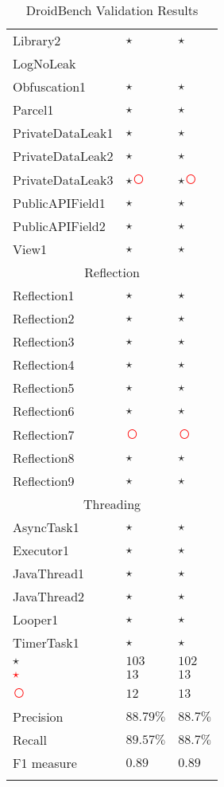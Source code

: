 \documentclass[../draft.tex]{subfiles}
\newcommand{\fp}{\textcolor{white}{\textcircled{\textcolor{red}{$\star$}}}}
\newcommand{\fn}{\textcolor{red}{\textcircled{ }}}
\newcommand{\tp}[0]{\textcircled{$\star$}}
\newcommand{\tsub}[1]{\multicolumn{3}{c}{#1}\\\hline}
\begin{document}
\begin{longtable}{l | l | l}
        Library2 & \tp & \tp\\
        LogNoLeak & & \\
        Obfuscation1 & \tp & \tp\\
        Parcel1 & \tp & \tp\\
        PrivateDataLeak1 & \tp & \tp\\
        PrivateDataLeak2 & \tp & \tp\\
        PrivateDataLeak3 & \tp \fn & \tp \fn\\
        PublicAPIField1 & \tp & \tp\\
        PublicAPIField2 & \tp & \tp\\
        View1 & \tp & \tp\\
        \hline
        \tsub{Reflection}
        Reflection1 & \tp & \tp\\
        Reflection2 & \tp & \tp\\
        Reflection3 & \tp & \tp\\
        Reflection4 & \tp & \tp\\
        Reflection5 & \tp & \tp\\
        Reflection6 & \tp & \tp\\
        Reflection7 & \fn & \fn\\
        Reflection8 & \tp & \tp\\
        Reflection9 & \tp & \tp\\
        \hline
        \tsub{Threading}
        AsyncTask1 & \tp & \tp\\
        Executor1 & \tp & \tp\\
        JavaThread1 & \tp & \tp\\
        JavaThread2 & \tp & \tp\\
        Looper1 & \tp & \tp\\
        TimerTask1 & \tp & \tp\\
        \hline\hline  %
        \tp &$ 103 $&$ 102 $\\
        \fp &$ 13 $&$ 13 $\\
        \fn &$ 12 $&$ 13 $\\
        Precision & $ 88.79 \%$ & $ 88.7 \%$\\
        Recall & $ 89.57 \% $ & $ 88.7 \%$\\
        F1 measure & $ 0.89 $ & $ 0.89 $\\
        \caption{DroidBench Validation Results}
        \label{t:droidbenchvalidation}
    \end{longtable}
\end{document}

